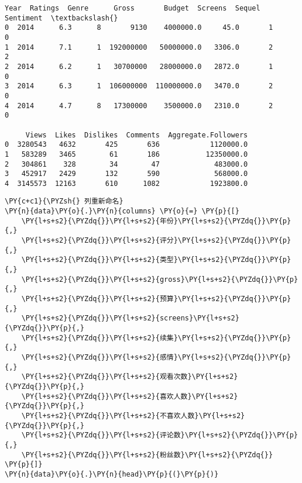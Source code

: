             \begin{tcolorbox}[breakable, size=fbox, boxrule=.5pt, pad at break*=1mm, opacityfill=0]
\begin{Verbatim}[commandchars=\\\{\}]
   Year  Ratings  Genre      Gross       Budget  Screens  Sequel  Sentiment  \textbackslash{}
0  2014      6.3      8       9130    4000000.0     45.0       1          0
1  2014      7.1      1  192000000   50000000.0   3306.0       2          2
2  2014      6.2      1   30700000   28000000.0   2872.0       1          0
3  2014      6.3      1  106000000  110000000.0   3470.0       2          0
4  2014      4.7      8   17300000    3500000.0   2310.0       2          0

     Views  Likes  Dislikes  Comments  Aggregate.Followers
0  3280543   4632       425       636            1120000.0
1   583289   3465        61       186           12350000.0
2   304861    328        34        47             483000.0
3   452917   2429       132       590             568000.0
4  3145573  12163       610      1082            1923800.0
\end{Verbatim}
\end{tcolorbox}
        
    \begin{tcolorbox}[breakable, size=fbox, boxrule=1pt, pad at break*=1mm,colback=cellbackground, colframe=cellborder]
\begin{Verbatim}[commandchars=\\\{\}]
\PY{c+c1}{\PYZsh{} 列重新命名}
\PY{n}{data}\PY{o}{.}\PY{n}{columns} \PY{o}{=} \PY{p}{[}
    \PY{l+s+s2}{\PYZdq{}}\PY{l+s+s2}{年份}\PY{l+s+s2}{\PYZdq{}}\PY{p}{,}
    \PY{l+s+s2}{\PYZdq{}}\PY{l+s+s2}{评分}\PY{l+s+s2}{\PYZdq{}}\PY{p}{,}
    \PY{l+s+s2}{\PYZdq{}}\PY{l+s+s2}{类型}\PY{l+s+s2}{\PYZdq{}}\PY{p}{,}
    \PY{l+s+s2}{\PYZdq{}}\PY{l+s+s2}{gross}\PY{l+s+s2}{\PYZdq{}}\PY{p}{,}
    \PY{l+s+s2}{\PYZdq{}}\PY{l+s+s2}{预算}\PY{l+s+s2}{\PYZdq{}}\PY{p}{,}
    \PY{l+s+s2}{\PYZdq{}}\PY{l+s+s2}{screens}\PY{l+s+s2}{\PYZdq{}}\PY{p}{,}
    \PY{l+s+s2}{\PYZdq{}}\PY{l+s+s2}{续集}\PY{l+s+s2}{\PYZdq{}}\PY{p}{,}
    \PY{l+s+s2}{\PYZdq{}}\PY{l+s+s2}{感情}\PY{l+s+s2}{\PYZdq{}}\PY{p}{,}
    \PY{l+s+s2}{\PYZdq{}}\PY{l+s+s2}{观看次数}\PY{l+s+s2}{\PYZdq{}}\PY{p}{,}
    \PY{l+s+s2}{\PYZdq{}}\PY{l+s+s2}{喜欢人数}\PY{l+s+s2}{\PYZdq{}}\PY{p}{,}
    \PY{l+s+s2}{\PYZdq{}}\PY{l+s+s2}{不喜欢人数}\PY{l+s+s2}{\PYZdq{}}\PY{p}{,}
    \PY{l+s+s2}{\PYZdq{}}\PY{l+s+s2}{评论数}\PY{l+s+s2}{\PYZdq{}}\PY{p}{,}
    \PY{l+s+s2}{\PYZdq{}}\PY{l+s+s2}{粉丝数}\PY{l+s+s2}{\PYZdq{}}
\PY{p}{]}
\PY{n}{data}\PY{o}{.}\PY{n}{head}\PY{p}{(}\PY{p}{)}
\end{Verbatim}
\end{tcolorbox}

